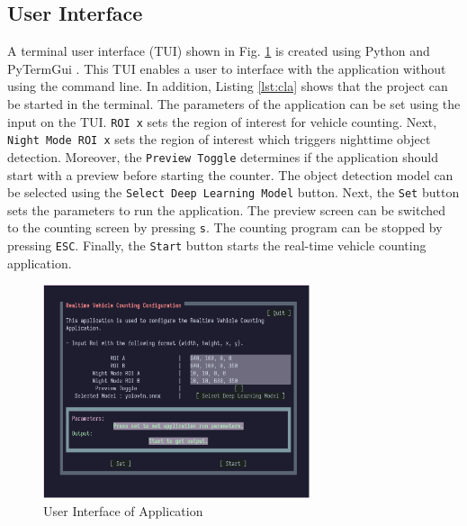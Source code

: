 \documentclass[12pt,a4paper,fleqn]{report}
\begin{document}
\subsection{User Interface}
A terminal user interface (TUI) shown in Fig. \ref{fig:rvc-tui} is created using Python and PyTermGui \cite{pytermgui:2022}. 
This TUI enables a user to interface with the application without using the command line. 
In addition, Listing \ref{lst:cla} shows that the project can be started in the terminal.
The parameters of the application can be set using the input on the TUI. 
\texttt{ROI x} sets the region of interest for vehicle counting.
Next, \texttt{Night Mode ROI x} sets the region of interest which triggers nighttime object
detection.
Moreover, the \texttt{Preview Toggle} determines if the application should start with a
preview before starting the counter.
The object detection model can be selected using the \texttt{Select Deep Learning Model}
button. 
Next, the \texttt{Set} button sets the parameters to run the application. 
The preview screen can be switched to the counting screen by pressing \texttt{s}. 
The counting program can be stopped by pressing \texttt{ESC}. 
Finally, the \texttt{Start} button starts the real-time vehicle counting application.

\begin{figure}[htbp]
    \begin{center}
        \includegraphics[width=0.7\textwidth]{figures/rvc-tui.png}
    \end{center}
    \caption{User Interface of Application}
    \label{fig:rvc-tui}
\end{figure}
\end{document}
